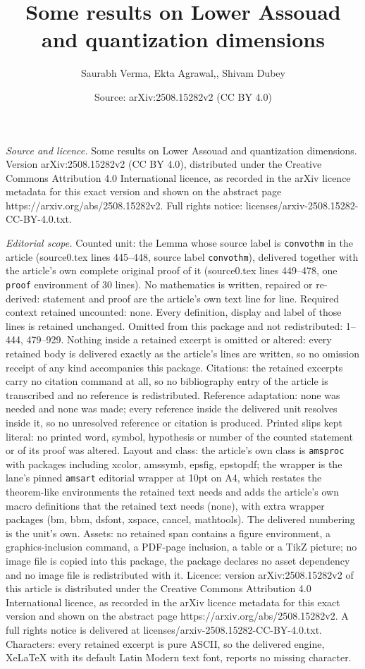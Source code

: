 \documentclass[10pt,a4paper]{amsart}
\title[Some results on Lower Assouad and quantization dimensions]{Some results on Lower Assouad and quantization dimensions}
\author{Saurabh Verma, Ekta Agrawal,, Shivam Dubey}
\date{Source: arXiv:2508.15282v2 (CC BY 4.0)}
\begin{document}
\maketitle

\noindent\emph{Source and licence.} Some results on Lower Assouad and quantization dimensions. Version arXiv:2508.15282v2 (CC BY 4.0), distributed under the Creative Commons Attribution 4.0 International licence, as recorded in the arXiv licence metadata for this exact version and shown on the abstract page https://arxiv.org/abs/2508.15282v2. Full rights notice: licenses/arxiv-2508.15282-CC-BY-4.0.txt.\par\smallskip

\noindent\textit{Editorial scope.} Counted unit: the Lemma whose source label is \texttt{convothm} in the article (source0.tex lines 445--448, source label \texttt{convothm}), delivered together with the article's own complete original proof of it (source0.tex lines 449--478, one \texttt{proof} environment of 30 lines). No mathematics is written, repaired or re-derived: statement and proof are the article's own text line for line. Required context retained uncounted: none. Every definition, display and label of those lines is retained unchanged. Omitted from this package and not redistributed: 1--444, 479--929. Nothing inside a retained excerpt is omitted or altered: every retained body is delivered exactly as the article's lines are written, so no omission receipt of any kind accompanies this package. Citations: the retained excerpts carry no citation command at all, so no bibliography entry of the article is transcribed and no reference is redistributed. Reference adaptation: none was needed and none was made; every reference inside the delivered unit resolves inside it, so no unresolved reference or citation is produced. Printed slips kept literal: no printed word, symbol, hypothesis or number of the counted statement or of its proof was altered. Layout and class: the article's own class is \texttt{amsproc} with packages including xcolor, amssymb, epsfig, epstopdf; the wrapper is the lane's pinned \texttt{amsart} editorial wrapper at 10pt on A4, which restates the theorem-like environments the retained text needs and adds the article's own macro definitions that the retained text needs (none), with extra wrapper packages (bm, bbm, dsfont, xspace, cancel, mathtools). The delivered numbering is the unit's own. Assets: no retained span contains a figure environment, a graphics-inclusion command, a PDF-page inclusion, a table or a TikZ picture; no image file is copied into this package, the package declares no asset dependency and no image file is redistributed with it. Licence: version arXiv:2508.15282v2 of this article is distributed under the Creative Commons Attribution 4.0 International licence, as recorded in the arXiv licence metadata for this exact version and shown on the abstract page https://arxiv.org/abs/2508.15282v2. A full rights notice is delivered at licenses/arxiv-2508.15282-CC-BY-4.0.txt. Characters: every retained excerpt is pure ASCII, so the delivered engine, XeLaTeX with its default Latin Modern text font, reports no missing character.
\end{document}
